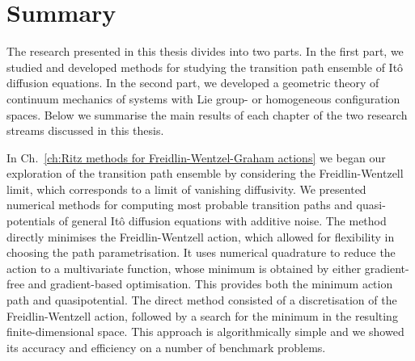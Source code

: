 \documentclass[]{cam-thesis}
\begin{document}





\chapter*{Summary}
 
The research presented in this thesis divides into two parts. In the first part, we studied and developed methods for studying the transition path ensemble of It\^{o} diffusion equations. In the second part, we developed a geometric theory of continuum mechanics of systems with Lie group- or homogeneous configuration spaces. Below we summarise the main results of each chapter of the two research streams discussed in this thesis.


In Ch.~\ref{ch:Ritz methods for Freidlin-Wentzel-Graham actions} we began our exploration of the transition path ensemble by considering the Freidlin-Wentzell limit, which corresponds to a limit of vanishing diffusivity. We presented numerical methods for computing most probable transition paths and quasi-potentials of general It\^{o} diffusion equations with additive noise. The method directly minimises the Freidlin-Wentzell action, which allowed for flexibility in choosing the path parametrisation. It uses numerical quadrature to reduce the action to a multivariate function, whose minimum is obtained by either gradient-free and gradient-based optimisation. This provides both the minimum action path and quasipotential. The direct method consisted of a discretisation of the Freidlin-Wentzell action, followed by a search for the minimum in the resulting finite-dimensional space. This approach is algorithmically simple and we showed its accuracy and efficiency on a number of benchmark problems.
\end{document}

